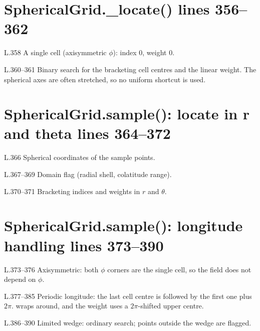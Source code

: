 \section*{\normalsize SphericalGrid.\_locate() \hfill{\small\mdseries\color{gray}lines 356--362}}

\begin{lines}
\item[L.358] A single cell (axisymmetric $\phi$): index 0, weight 0.
\item[L.360–361] Binary search for the bracketing cell centres and the linear weight. The spherical axes are often stretched, so no uniform shortcut is used.
\end{lines}
\section*{\normalsize SphericalGrid.sample(): locate in r and theta \hfill{\small\mdseries\color{gray}lines 364--372}}

\begin{lines}
\item[L.366] Spherical coordinates of the sample points.
\item[L.367–369] Domain flag (radial shell, colatitude range).
\item[L.370–371] Bracketing indices and weights in $r$ and $\theta$.
\end{lines}
\section*{\normalsize SphericalGrid.sample(): longitude handling \hfill{\small\mdseries\color{gray}lines 373--390}}

\begin{lines}
\item[L.373–376] Axisymmetric: both $\phi$ corners are the single cell, so the field does not depend on $\phi$.
\item[L.377–385] Periodic longitude: the last cell centre is followed by the first one plus $2\pi$.  wraps around, and the weight uses a $2\pi$-shifted upper centre.
\item[L.386–390] Limited wedge: ordinary search; points outside the wedge are flagged.
\end{lines}
